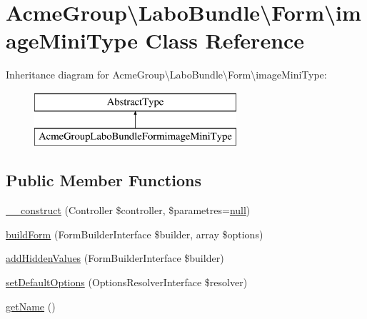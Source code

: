 \hypertarget{class_acme_group_1_1_labo_bundle_1_1_form_1_1image_mini_type}{\section{Acme\+Group\textbackslash{}Labo\+Bundle\textbackslash{}Form\textbackslash{}image\+Mini\+Type Class Reference}
\label{class_acme_group_1_1_labo_bundle_1_1_form_1_1image_mini_type}
}
Inheritance diagram for Acme\+Group\textbackslash{}Labo\+Bundle\textbackslash{}Form\textbackslash{}image\+Mini\+Type\+:\begin{figure}[H]
\begin{center}
\leavevmode
\includegraphics[height=2.000000cm]{class_acme_group_1_1_labo_bundle_1_1_form_1_1image_mini_type}
\end{center}
\end{figure}
\subsection*{Public Member Functions}
\begin{DoxyCompactItemize}
\item 
\hyperlink{class_acme_group_1_1_labo_bundle_1_1_form_1_1image_mini_type_a90dfb13b1904c1f56214d8e551db033f}{\+\_\+\+\_\+construct} (Controller \$controller, \$parametres=\hyperlink{validate_8js_afb8e110345c45e74478894341ab6b28e}{null})
\item 
\hyperlink{class_acme_group_1_1_labo_bundle_1_1_form_1_1image_mini_type_acc185fb9ce078bd01177f61e0380ae39}{build\+Form} (Form\+Builder\+Interface \$builder, array \$options)
\item 
\hyperlink{class_acme_group_1_1_labo_bundle_1_1_form_1_1image_mini_type_a2bf276cfdef38f99de7ddfb616393752}{add\+Hidden\+Values} (Form\+Builder\+Interface \$builder)
\item 
\hyperlink{class_acme_group_1_1_labo_bundle_1_1_form_1_1image_mini_type_a913d5024d4c90ac9efde0b02b31b2618}{set\+Default\+Options} (Options\+Resolver\+Interface \$resolver)
\item 
\hyperlink{class_acme_group_1_1_labo_bundle_1_1_form_1_1image_mini_type_a8c6a383b05261524f305d5d719291569}{get\+Name} ()
\end{DoxyCompactItemize}


